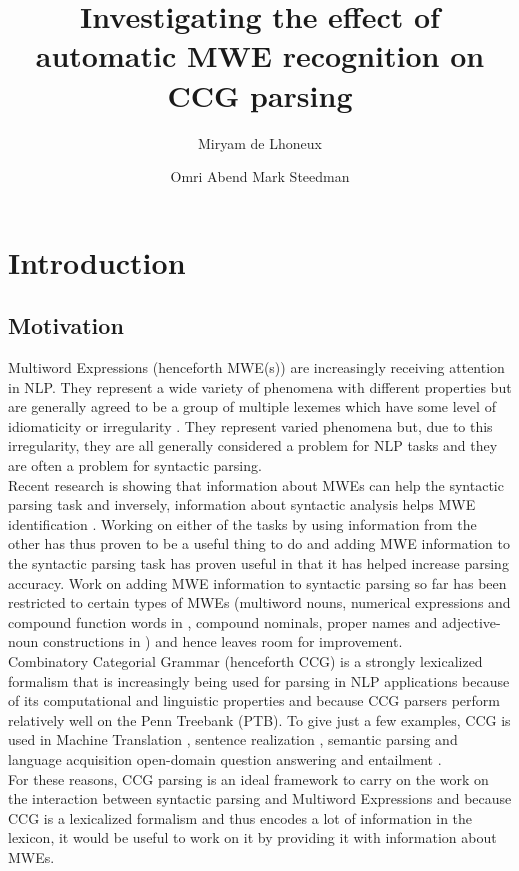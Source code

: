 \documentclass[output=paper]{LSP/langsci}
\author{Miryam de Lhoneux\affiliation{Uppsala University}\and Omri Abend \affiliation{Hebrew University of Jerusalem}\lastand Mark Steedman \affiliation{University of Edinburgh}
}
\title{Investigating the effect of automatic MWE recognition on CCG parsing}
\begin{document}
\section{Introduction}
\label{introduction}

\subsection{Motivation}
\indent Multiword Expressions (henceforth MWE(s)) are increasingly receiving attention in NLP. They represent a wide variety of phenomena with different properties but are generally agreed to be a group of multiple lexemes which have some level of idiomaticity or irregularity \citep{sag02}. They represent varied phenomena but, due to this irregularity, they are all generally considered a problem for NLP tasks and they are often a problem for syntactic parsing. \\
\indent Recent research is showing that information about MWEs can help the syntactic parsing task \citep{nivre2004multiword,korkontzelosetal2010} and inversely, information about syntactic analysis helps MWE identification \citep{greenetal13,weller&heid2010,martens&vandeghinste2010}. Working on either of the tasks by using information from the other has thus proven to be a useful thing to do and adding MWE information to the syntactic parsing task has proven useful in that it has helped increase parsing accuracy. Work on adding MWE information to syntactic parsing so far has been restricted to certain types of MWEs (multiword nouns, numerical expressions and compound function words in \citet{nivre2004multiword}, compound nominals, proper names and adjective-noun constructions in \citet{korkontzelosetal2010}) and hence leaves room for improvement.\\
\indent Combinatory Categorial Grammar (henceforth CCG) is a strongly lexicalized formalism that is increasingly being used for parsing in NLP applications because of its computational and linguistic properties and because CCG parsers perform relatively well on the Penn Treebank (PTB). To give just a few examples, CCG is used in Machine Translation \citep[e.g.][]{birch2007ccg}, sentence realization \citep[e.g][]{white2006efficient}, semantic parsing and language acquisition \citep[e.g.][]{krishnamurthy2012weakly} open-domain question answering and entailment \citep[e.g.][]{lewis2013combining}.\\
\indent For these reasons, CCG parsing is an ideal framework to carry on the work on the interaction between syntactic parsing and Multiword Expressions and because CCG is a lexicalized formalism and thus encodes a lot of information in the lexicon, it would be useful to work on it by providing it with information about MWEs. 
\end{document}
